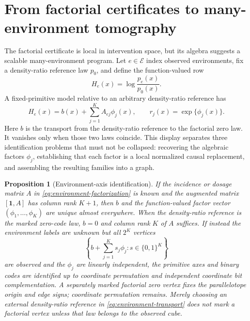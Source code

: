 \documentclass[11pt]{article}
\newtheorem{proposition}[theorem]{Proposition}
\begin{document}
\section{From factorial certificates to many-environment tomography}
\label{sec:tomography}

The factorial certificate is local in intervention space, but its algebra
suggests a scalable many-environment program.  Let \(e\in\mathcal E\) index
observed environments, fix a density-ratio reference law \(p_0\), and define the
function-valued row
\begin{equation}
H_e(x)=\log\frac{p_e(x)}{p_0(x)}.
\label{eq:environment-transport}
\end{equation}
A fixed-primitive model relative to an arbitrary density-ratio reference has
\begin{equation}
H_e(x)=b(x)+\sum_{j=1}^K A_{ej}\phi_j(x),
\qquad r_j(x)=\exp\{\phi_j(x)\}.
\label{eq:environment-factorization}
\end{equation}
Here \(b\) is the transport from the density-ratio reference to the factorial
zero law.  It vanishes only when those two laws coincide.
This display separates three identification problems that must not be
collapsed: recovering the algebraic factors \(\phi_j\), establishing that each
factor is a local normalized causal replacement, and assembling the resulting
families into a graph.

\begin{proposition}[Environment-axis identification]
\label{prop:environment-axes}
If the incidence or dosage matrix \(A\) in
\eqref{eq:environment-factorization} is known and the augmented matrix
\([\mathbf 1,A]\) has column rank \(K+1\), then \(b\) and the function-valued
factor vector \((\phi_1,\ldots,\phi_K)\) are unique almost everywhere.  When
the density-ratio reference is the marked zero-code law, \(b=0\) and column
rank \(K\) of \(A\) suffices.  If instead the environment labels are unknown
but all \(2^K\)
vertices
\begin{equation}
\left\{b+\sum_{j=1}^K s_j\phi_j:s\in\{0,1\}^K\right\}
\end{equation}
are observed and the \(\phi_j\) are linearly independent, the primitive axes
and binary codes are identified up to coordinate permutation and independent
coordinate bit complementation.
A separately marked factorial zero vertex fixes the parallelotope origin and
edge signs; coordinate permutation remains.  Merely choosing an external
density-ratio reference in \eqref{eq:environment-transport} does not mark a
factorial vertex unless that law belongs to the observed cube.
\end{proposition}
\end{document}
